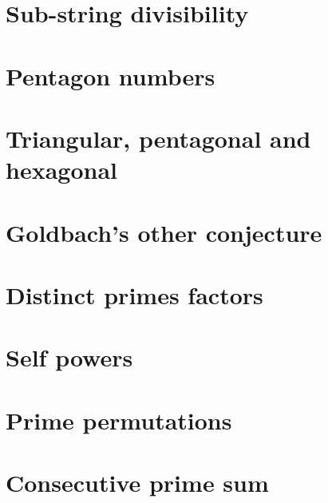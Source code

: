 \documentclass[11pt]{article}
\begin{document}
\section{Sub-string divisibility} 

\section{Pentagon numbers} 

\section{Triangular, pentagonal and hexagonal} 

\section{Goldbach's other conjecture} 

\section{Distinct primes factors} 

\section{Self powers} 

\section{Prime permutations} 

\section{Consecutive prime sum} 
\end{document}
